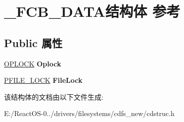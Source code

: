 \hypertarget{struct___f_c_b___d_a_t_a}{}\section{\+\_\+\+F\+C\+B\+\_\+\+D\+A\+T\+A结构体 参考}
\label{struct___f_c_b___d_a_t_a}
\subsection*{Public 属性}
\begin{DoxyCompactItemize}
\item 
\mbox{\label{struct___f_c_b___d_a_t_a_a7c11056946a43830ba86859695621859}} 
\hyperlink{interfacevoid}{O\+P\+L\+O\+CK} {\bfseries Oplock}
\item 
\mbox{\label{struct___f_c_b___d_a_t_a_a84d18c1e9b0cc20fb0c3dcd3b7e4eea2}} 
\hyperlink{struct___f_i_l_e___l_o_c_k}{P\+F\+I\+L\+E\+\_\+\+L\+O\+CK} {\bfseries File\+Lock}
\end{DoxyCompactItemize}


该结构体的文档由以下文件生成\+:\begin{DoxyCompactItemize}
\item 
E\+:/\+React\+O\+S-\/0../drivers/filesystems/cdfs\+\_\+new/cdstruc.\+h\end{DoxyCompactItemize}
